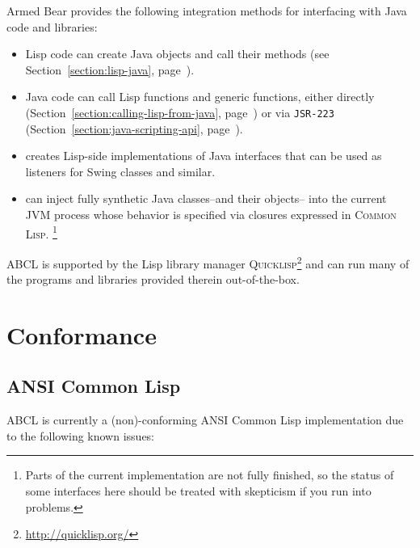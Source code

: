 \documentclass[10pt]{book}
\begin{document}
Armed Bear provides the following integration methods for interfacing
with Java code and libraries:
\begin{itemize}
\item Lisp code can create Java objects and call their methods (see
  Section~\ref{section:lisp-java}, page~\pageref{section:lisp-java}).
\item Java code can call Lisp functions and generic functions, either
  directly (Section~\ref{section:calling-lisp-from-java},
  page~\pageref{section:calling-lisp-from-java}) or via \texttt{JSR-223}
  (Section~\ref{section:java-scripting-api},
  page~\pageref{section:java-scripting-api}).
\item {} creates Lisp-side implementations
  of Java interfaces that can be used as listeners for Swing classes and
  similar.
\item {} can inject fully synthetic Java
  classes--and their objects-- into the current JVM process whose
  behavior is specified via closures expressed in \textsc{Common
    Lisp}. \footnote{Parts of the current implementation are not fully
    finished, so the status of some interfaces here should be treated
    with skepticism if you run into problems.}

\end{itemize}
\textsc{ABCL} is supported by the Lisp library manager
\textsc{Quicklisp}\footnote{\url{http://quicklisp.org/}} and can run many of the
programs and libraries provided therein out-of-the-box.

\section{Conformance}
\label{section:conformance}

\subsection{ANSI Common Lisp}
\textsc{ABCL} is currently a (non)-conforming \textsc{ANSI} Common Lisp
implementation due to the following known issues:
\end{document}
